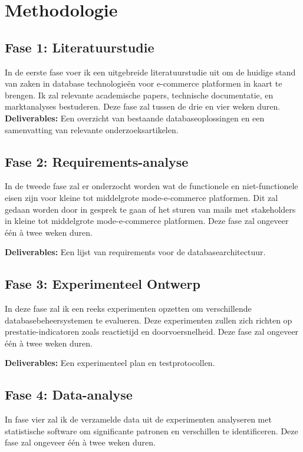 \section{Methodologie}
\label{sec:methodologie}

\subsection{Fase 1: Literatuurstudie}
\label{subsec:literatuurstudie}
In de eerste fase voer ik een uitgebreide literatuurstudie uit om de huidige stand van zaken in database technologieën voor e-commerce platformen in kaart te brengen. Ik zal relevante academische papers, technische documentatie, en marktanalyses bestuderen. Deze fase zal tussen de drie en vier weken duren.
\textbf{Deliverables:} Een overzicht van bestaande databaseoplossingen en een samenvatting van relevante onderzoeksartikelen.

\subsection{Fase 2: Requirements-analyse}
\label{subsec:requirementsanalyse}
In de tweede fase zal er onderzocht worden wat de functionele en niet-functionele eisen zijn voor kleine tot middelgrote mode-e-commerce platformen. Dit zal gedaan worden door in gesprek te gaan of het sturen van mails met stakeholders in kleine tot middelgrote mode-e-commerce platformen. Deze fase zal ongeveer één à twee weken duren. 

\textbf{Deliverables:} Een lijst van requirements voor de databasearchitectuur.

\subsection{Fase 3: Experimenteel Ontwerp}
\label{subsec:experimenteelontwerp}
In deze fase zal ik een reeks experimenten opzetten om verschillende databasebeheersystemen te evalueren. Deze experimenten zullen zich richten op prestatie-indicatoren zoals reactietijd en doorvoersnelheid. Deze fase zal ongeveer één à twee weken duren. 

\textbf{Deliverables:} Een experimenteel plan en testprotocollen.

\subsection{Fase 4: Data-analyse}
\label{subsec:dataanalyse}
In fase vier zal ik de verzamelde data uit de experimenten analyseren met statistische software om significante patronen en verschillen te identificeren. Deze fase zal ongeveer één à twee weken duren. 

